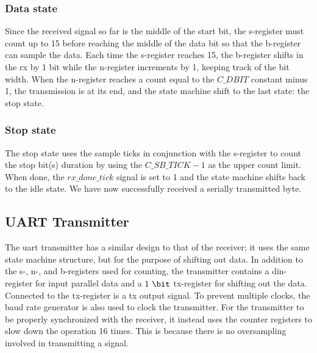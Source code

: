 \documentclass[main.tex]{subfiles}
\begin{document}
\subsubsection{Data state}
Since the received signal so far is the middle of the start bit, the s-register must count up to 15  before reaching the middle of the data bit so that the b-register can sample the data. Each time the s-register reaches 15, the b-register shifts in the rx by 1 bit while the n-register increments by 1, keeping track of the bit width. When the n-register reaches a count equal to the $C\_DBIT$ constant minus 1, the transmission is at its end, and the state machine shift to the last state: the stop state. 

\subsubsection{Stop state}
The stop state uses the sample ticks in conjunction with the s-register to count the stop bit(s) duration by using the $C\_SB\_TICK-1$ as the upper count limit. When done, the  $rx\_done\_tick$ signal is set to 1 and the state machine shifts back to the idle state. We have now successfully received a serially  transmitted byte. %

\subsection{UART Transmitter}
The \gls{uart} transmitter has a similar design to that of the receiver; it uses the same state machine structure, but for the purpose of shifting out data. In addition to the s-, n-, and b-registers used for counting, the transmitter contains a din-register for input parallel data and a $1~\bit$ tx-register for shifting out the data. Connected to the tx-register is a tx output signal. To prevent multiple clocks, the baud rate generator is also used to clock the transmitter. For the transmitter to be properly synchronized with the receiver, it instead uses the counter registers to slow down the operation 16 times. This is because there is no oversampling involved in transmitting a signal.\\
\end{document}
